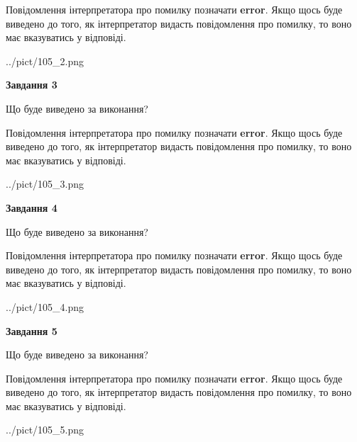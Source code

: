 \documentclass[12pt, ukrainian]{article}
\begin{document}
{\begin {large}
Повідомлення інтерпретатора про помилку позначати \textbf{error}.
Якщо щось буде виведено до того, як інтерпретатор видасть повідомлення про помилку, 
то воно має вказуватись у відповіді. \par


\begin{center}
	{../pict/105_2.png}
\end{center}
\newpage

{\begin {center}\textbf{Завдання 3}\end {center}}\par
Що буде виведено за виконання?

Повідомлення інтерпретатора про помилку позначати \textbf{error}.
Якщо щось буде виведено до того, як інтерпретатор видасть повідомлення про помилку, 
то воно має вказуватись у відповіді. \par


\begin{center}
	{../pict/105_3.png}
\end{center}
\newpage

{\begin {center}\textbf{Завдання 4}\end {center}}\par
Що буде виведено за виконання?

Повідомлення інтерпретатора про помилку позначати \textbf{error}.
Якщо щось буде виведено до того, як інтерпретатор видасть повідомлення про помилку, 
то воно має вказуватись у відповіді. \par


\begin{center}
	{../pict/105_4.png}
\end{center}
\newpage

{\begin {center}\textbf{Завдання 5}\end {center}}\par
Що буде виведено за виконання?

Повідомлення інтерпретатора про помилку позначати \textbf{error}.
Якщо щось буде виведено до того, як інтерпретатор видасть повідомлення про помилку, 
то воно має вказуватись у відповіді. \par


\begin{center}
	{../pict/105_5.png}
\end{center}
\newpage


\end{large}}
\end{document}

